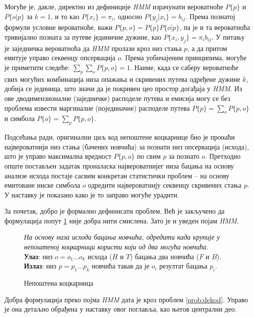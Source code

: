 \documentclass[12pt,oneside]{memoir}
\newenvironment{problem}[1][!ht]
{\renewcommand{\algorithmcfname}{Проблем}
\begin{figure}[!ht]
\centering
  \begin{minipage}{.94\linewidth}
	\begin{algorithm}[#1]%
  }{\end{algorithm}
  \end{minipage}
\end{figure}}
\begin{document}
\begin{CJK}{UTF8}{ipxm}
Могуће је, дакле, директно из дефиниције \textit{HMM} израчунати вероватноће  $P\{p\}$ и $P\{o | p\}$ за $k = 1$, и то као $P\{x_i\} = \pi_i$, односно $P\{y_j | x_i\} = b_{ij}$. Према познатој формули условне вероватноће, важи $P\{p, o\} = P\{p\} P\{o | p\}$, па је и та вероватноћа тривијално позната за путеве јединичне дужине, као $P\{x_i, y_j\} = \pi_i b_{ij}$. У питању је заједничка вероватноћа да \textit{HMM} пролази кроз низ стања $p$, а да притом емитује управо секвенцу опсервација $o$. Према уобичајеним принципима, могуће је приметити следеће: $\sum_p \sum_o P\{p, o\} = 1$. Наиме, када се саберу вероватноће свих могућих комбинација низа опажања и скривених путева одређене дужине $k$, добија се јединица, што значи да је покривен цео простор догађаја у \textit{HMM}. Из ове дводимензионалне (заједничке) расподеле путева и емисија могу се без проблема извести маргиналне (појединачне) расподеле путева $P\{p\} = \sum_o P\{p, o\}$ и симбола $P\{o\} = \sum_p P\{p, o\}$.

Подсећања ради, оригинални циљ код непоштене коцкарнице био је пронаћи највероватнији низ стања (бачених новчића) за познати низ опсервација (исхода), што је управо максимална вредност $P\{p, o\}$ по свим $p$ за познато $o$. Претходно опште постављен задатак проналаска највероватнијег низа бацања на основу анализе исхода постаје сасвим конкретан статистички проблем -- на основу емитоване ниске симбола $o$ одредити највероватнију секвенцу скривених стања $p$. У наставку је показано како је то заправо могуће урадити.

За почетак, добро је формално дефинисати проблем. Већ је закључено да формулација попут \ref{prob:kock} није добра нити смислена. Зато је и уведен појам \textit{HMM}.

\begin{problem}[H]
  \SetAlgoLined
  \textit{На основу низа исхода бацања новчића, одредити када крупије у непоштеној коцкарници користи који од два могућа новчића.}\\
  \textbf{Улаз}: низ $o = o_1...o_k$ исхода ($H$ и $T$) бацања два новчића ($F$ и $B$).\\
  \textbf{Излаз}: низ $p = p_1...p_k$ новчића такав да је $o_i$ резултат бацања $p_i$.
  \caption{Непоштена коцкарница}
  \label{prob:kock}
\end{problem}

Добра формулација преко појма \textit{HMM} дата је кроз проблем \ref{prob:dekod}. Управо је она детаљно обрађена у наставку овог поглавља, као његов централни део.


\end{CJK}
\end{document}

